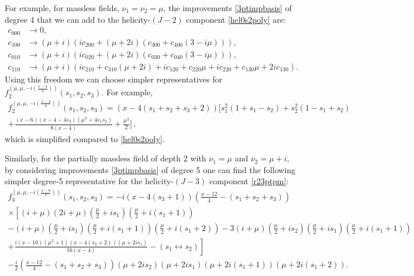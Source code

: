 \documentclass[11pt,a4paper]{article}
\begin{document}
For example, for massless fields, $\nu_1=\nu_2=\mu$, the improvements \eqref{3ptimpbasis} of degree 4 that we can add to the helicity-$\left(J-2\right)$ component \eqref{hel0s2poly} are:
\begin{subequations}
\begin{align}
c_{000} &\to 0,\\
c_{100} &\to (\mu +i) (i c_{200}+(\mu +2 i) (c_{300}+c_{400} (3-i \mu ))),\\
c_{010} &\to (\mu +i) (i c_{020}+(\mu +2 i) (c_{030}+c_{040} (3-i \mu ))),\\
   c_{110}&\to (\mu +i) (i c_{210}+c_{310} (\mu +2 i)+i c_{120}+c_{220} \mu +i c_{220}+c_{130} \mu +2 i c_{130}).
\end{align}
\end{subequations}
Using this freedom we can choose simpler representatives for $f^{\left(\mu,\mu,-i\left(\frac{x-4}{4}\right)\right)}_2(s_1,s_2,s_3)$. For example,
\begin{multline}
    f^{\left(\mu,\mu,-i\left(\frac{x-4}{4}\right)\right)}_2(s_1,s_2,s_3)=(x-4 (s_1+s_2+s_3+2))\Big[s_1^2(1+s_1-s_2)+s_2^2(1-s_1+s_2)\\+\frac{(x-6) (x-4-4 s_3) \left(\mu ^2+4 s_1 s_2\right)}{8 (x-4)}+\tfrac{\mu ^2}{2}\Big]\,,
\end{multline}
which is simplified compared to \eqref{hel0s2poly}.

Similarly, for the partially massless field of depth 2 with $\nu_1=\mu$ and $\nu_2=\mu+i$, by considering improvements \eqref{3ptimpbasis} of degree 5 one can find the following simpler degree-5 representative for the helicity-$\left(J-3\right)$ component \eqref{r23ptpm}:
\begin{multline}\label{simpr23ptpm}
 f^{\left(\mu,\mu,-i\left(\frac{x-8}{4}\right)\right)}_3(s_1,s_2,s_3)=-i(x-4 (s_3+1))\left(\tfrac{x-12}{4}-(s_1+s_2+s_3)\right)\\ \times \left[  \left(i+\mu \right) \left(2 i+\mu \right) \left(\tfrac{\mu}{2} +i s_1\right) \left(\tfrac{\mu}{2} +i \left(s_1+1\right)\right)\right.\\-\left(i+\mu \right) \left(\tfrac{\mu}{2} +i s_1\right) \left(\tfrac{\mu}{2} +i \left(s_1+1\right)\right) \left(\tfrac{\mu}{2} +i \left(s_1+2\right)\right)-3 \left(i+\mu \right) \left(\tfrac{\mu}{2} +i s_2\right) \left(\tfrac{\mu}{2} +i s_1\right)\left(\tfrac{\mu}{2} +i \left(s_1+1\right)\right)\\\left.+\frac{i(x-10) \left(\mu ^2+1\right)(x-4 (s_3+2)) (\mu +2 i s_1)}{16 (x-4)}-\left(s_1 \leftrightarrow s_2\right)\right]\\
  -\tfrac{i}{2}\left(\tfrac{x-12}{4}-(s_1+s_2+s_3)\right)(\mu +2 i s_2)  (\mu +2 i s_1)  (\mu +2 i (s_1+1))(\mu +2i( s_1+2)).
\end{multline}
\end{document}
